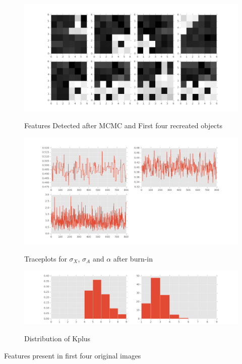 \documentclass{article}
\begin{document}
\begin{figure}
\caption {Features Detected after MCMC and First four recreated objects}
\includegraphics[width=\linewidth]{figures/Detected.png}
\label{fig:detected}
\end{figure}

\begin{figure}
\caption {Traceplots for $\sigma_X$, $\sigma_A$ and $\alpha$ after burn-in}
\includegraphics[width=\linewidth]{figures/Trace.png}
\label{fig:trace}
\end{figure}

\begin{figure}
\caption {Distribution of Kplus}
\includegraphics[width=\linewidth]{figures/kDistribution.png}
\label{fig:dist}
\end{figure}

\begin{table}[ht]
\centering
\caption{Features present in first four original images \label{features}}

\end{table}
\end{document}
